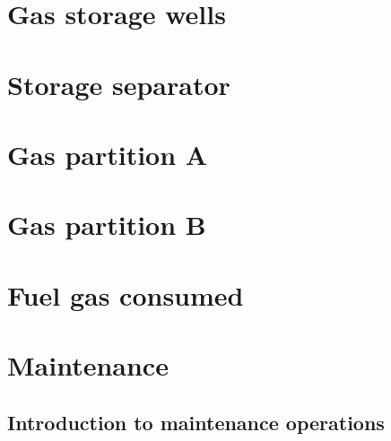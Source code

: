 \documentclass[11pt]{report}
\begin{document}
{%
\section{Gas storage wells}
\label{sec:gas_storage_wells}






\clearpage

\section{Storage separator}
\label{sec:storage_separator}





\clearpage

\section{Gas partition A}
\label{sec:gas_partition_a}






\clearpage

\section{Gas partition B}
\label{sec:gas_partition_b}









\clearpage

\section{Fuel gas consumed}
\label{sec:fuel_gas_consumed}








\clearpage

\section{Maintenance}
\label{sec:maintenance}

\subsection{Introduction to maintenance operations}

}
\end{document}

